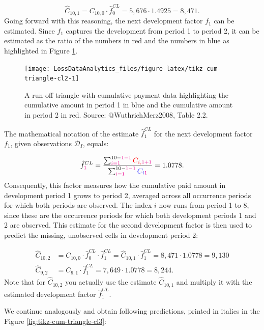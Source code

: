 \documentclass[]{book}
\begin{document}
\[
\hat{C}_{10, 1} = C_{10,0} \cdot \hat{f}^{CL}_0 = 5,676\cdot 1.4925=8,471.
\] Going forward with this reasoning, the next development factor
\(f_1\) can be estimated. Since \(f_1\) captures the development from
period 1 to period 2, it can be estimated as the ratio of the numbers in
red and the numbers in blue as highlighted in Figure
\ref{fig:tikz-cum-triangle-cl2}.

\begin{figure}

{\centering \texttt{[image: LossDataAnalytics\_files/figure-latex/tikz-cum-triangle-cl2-1]} 

}

\caption{A run-off triangle with cumulative payment data highlighting the cumulative amount in period 1 in blue and the cumulative amount in period 2 in red. Source: @WuthrichMerz2008, Table 2.2.}\label{fig:tikz-cum-triangle-cl2}
\end{figure}

The mathematical notation of the estimate \(\hat{f}_1^{CL}\) for the
next development factor \(f_1\), given observations \(\mathcal{D}_I\),
equals:

\[
\hat{f}^{CL}_{\color{magenta}{1}} = \frac{\sum_{i=1}^{10-\color{magenta}{1}-1} \color{red}{C_{i,\color{magenta}{1}+1}}}{\sum_{i=1}^{10-\color{magenta}{1}-1} \color{blue}{C_{i\color{magenta}{1}}}}=1.0778.
\] Consequently, this factor measures how the cumulative paid amount in
development period 1 grows to period 2, averaged across all occurrence
periods for which both periods are observed. The index \(i\) now runs
from period 1 to 8, since these are the occurrence periods for which
both development periods 1 and 2 are observed. This estimate for the
second development factor is then used to predict the missing,
unobserved cells in development period 2:

\[
\begin{array}{rl}
\hat{C}_{10,2} &= C_{10,0} \cdot \hat{f}^{CL}_0 \cdot \hat{f}_1^{CL} = \hat{C}_{10,1} \cdot \hat{f}_1^{CL} = 8,471 \cdot 1.0778 = 9,130 \\
\hat{C}_{9,2}  &= C_{9,1} \cdot \hat{f}^{CL}_1 = 7,649 \cdot 1.0778 = 8,244.
\end{array}
\] Note that for \(\hat{C}_{10,2}\) you actually use the estimate
\(\hat{C}_{10,1}\) and multiply it with the estimated development factor
\(\hat{f}_1^{CL}\).

We continue analogously and obtain following predictions, printed in
italics in the Figure \ref{fig:tikz-cum-triangle-cl3}:
\end{document}
